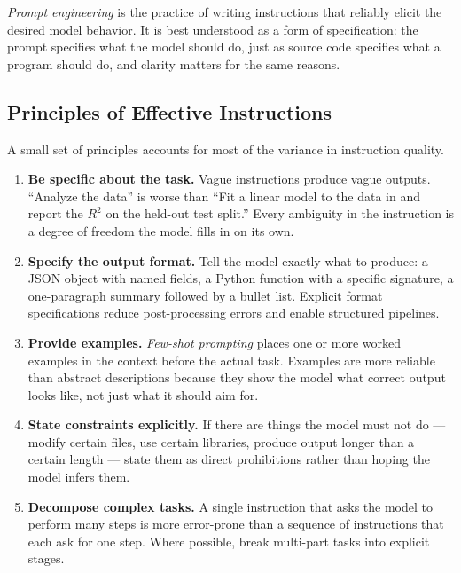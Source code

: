 \emph{Prompt engineering} is the practice of writing instructions that reliably elicit the desired model behavior.
It is best understood as a form of specification: the prompt specifies what the model should do, just as source code specifies what a program should do, and clarity matters for the same reasons.

\subsection{Principles of Effective Instructions}

A small set of principles accounts for most of the variance in instruction quality.

\begin{enumerate}
\item \textbf{Be specific about the task.}
Vague instructions produce vague outputs.
``Analyze the data'' is worse than ``Fit a linear model to the data in  and report the $R^2$ on the held-out test split.''
Every ambiguity in the instruction is a degree of freedom the model fills in on its own.

\item \textbf{Specify the output format.}
Tell the model exactly what to produce: a JSON object with named fields, a Python function with a specific signature, a one-paragraph summary followed by a bullet list.
Explicit format specifications reduce post-processing errors and enable structured pipelines.

\item \textbf{Provide examples.}
\emph{Few-shot prompting} places one or more worked examples in the context before the actual task.
Examples are more reliable than abstract descriptions because they show the model what correct output looks like, not just what it should aim for.

\item \textbf{State constraints explicitly.}
If there are things the model must not do — modify certain files, use certain libraries, produce output longer than a certain length — state them as direct prohibitions rather than hoping the model infers them.

\item \textbf{Decompose complex tasks.}
A single instruction that asks the model to perform many steps is more error-prone than a sequence of instructions that each ask for one step.
Where possible, break multi-part tasks into explicit stages.
\end{enumerate}

